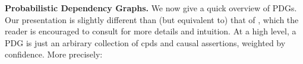 \documentclass[twoside]{article}
\begin{document}
\textbf{Probabilistic Dependency Graphs.}
We now give a quick overview of PDGs. Our presentation is slightly
different than (but equivalent to) that of 
\textcite{pdg-aaai}, which 
the reader is encouraged to consult for more details and intuition.
At a high level, a PDG
is just an arbirary collection of cpds and causal assertions,
    weighted by confidence. More precisely:
\end{document}
